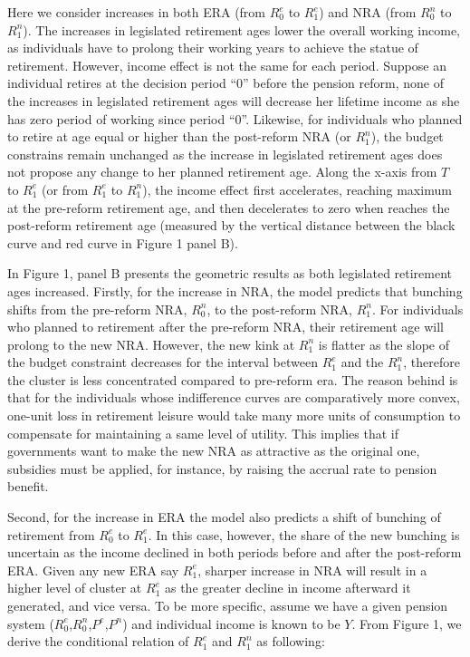 \documentclass[a4paper]{article}
\begin{document}
Here we consider increases in both ERA (from $R_0^e$ to $R_1^e$) and NRA (from $R_0^n$ to $R_1^n$). The increases in legislated retirement ages lower the overall working income, as individuals have to prolong their working years to achieve the statue of retirement. However, income effect is not the same for each period. Suppose an individual retires at the decision period “0” before the pension reform, none of the increases in legislated retirement ages will decrease her lifetime income as she has zero period of working since period “0”. Likewise, for individuals who planned to retire at age equal or higher than the post-reform NRA (or $R_1^n$), the budget constrains remain unchanged as the increase in legislated retirement ages does not propose any change to her planned retirement age. Along the x-axis from $T$ to $R_1^e$ (or from $R_1^e$ to $R_1^n$), the income effect first accelerates, reaching maximum at the pre-reform retirement age, and then decelerates to zero when reaches the post-reform retirement age (measured by the vertical distance between the black curve and red curve in Figure 1 panel B). 

In Figure 1, panel B presents the geometric results as both legislated retirement ages increased. Firstly, for the increase in NRA, the model predicts that bunching shifts from the pre-reform NRA, $R_0^n$, to the post-reform NRA, $R_1^n$. For individuals who planned to retirement after the pre-reform NRA, their retirement age will prolong to the new NRA. However, the new kink at  $R_1^n$ is flatter as the slope of the budget constraint decreases for the interval between $R_1^e$ and the $R_1^n$, therefore the cluster is less concentrated compared to pre-reform era. The reason behind is that for the individuals whose indifference curves are comparatively more convex, one-unit loss in retirement leisure would take many more units of consumption to compensate for maintaining a same level of utility. This implies that if governments want to make the new NRA as attractive as the original one, subsidies must be applied, for instance, by raising the accrual rate to pension benefit.  

Second, for the increase in ERA the model also predicts a shift of bunching of retirement from $R_0^e$ to $R_1^e$. In this case, however, the share of the new bunching is uncertain as the income declined in both periods before and after the post-reform ERA. Given any new ERA say $R_1^e$, sharper increase in NRA will result in a higher level of cluster at $R_1^e$ as the greater decline in income afterward it generated, and vice versa. To be more specific, assume we have a given pension system ($R_0^e$,$R_0^n$,$P^e$,$P^n$) and individual income is known to be $Y$. From Figure 1, we derive the conditional relation of $R_1^e$ and $R_1^n$ as following:
\end{document}
